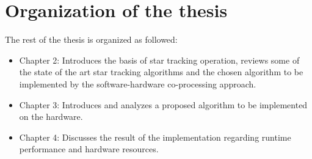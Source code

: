 \section{Organization of the thesis}
The rest of the thesis is organized as followed:
\begin{itemize}
	\item Chapter 2: Introduces the basis of star tracking operation, reviews some of the state of the art star tracking algorithms and the chosen algorithm to be implemented by the software-hardware co-processing approach.
	\item Chapter 3: Introduces and analyzes a proposed algorithm to be implemented on the hardware.
	\item Chapter 4: Discusses the result of the implementation regarding runtime performance and hardware resources.
\end{itemize}
